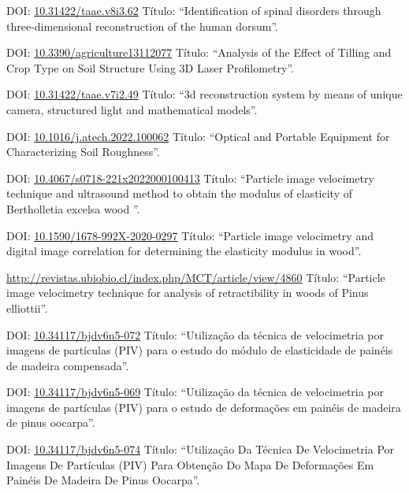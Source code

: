 \documentclass[11pt,a4paper,sans]{moderncv} %
\newcommand{\doiurl}[1]{\href{https://doi.org/#1}{#1}}
\begin{document}
	      {DOI: \doiurl{10.31422/taae.v8i3.62} }{}{}
	      {Título: ``Identification of spinal disorders through three-dimensional reconstruction of the human dorsum''.}
	      

	      {DOI: \doiurl{10.3390/agriculture13112077} }{}{}
	      {Título: ``Analysis of the Effect of Tilling and Crop Type on Soil Structure Using 3D Laser Profilometry''.}
	      
	      {DOI: \doiurl{10.31422/taae.v7i2.49} }{}{}
	      {Título: ``3d reconstruction system by means of unique camera, structured light and mathematical models''.}

	      {DOI: \doiurl{10.1016/j.atech.2022.100062} }{}{}
	      {Título: ``Optical and Portable Equipment for Characterizing Soil Roughness''.}
	      
	      {DOI: \doiurl{10.4067/s0718-221x2022000100413} }{}{}
	      {Título: ``Particle image velocimetry technique and ultrasound method to obtain the modulus of elasticity of Bertholletia excelsa wood ''.}
	      
	      {DOI: \doiurl{10.1590/1678-992X-2020-0297} }{}{}
	      {Título: ``Particle image velocimetry and digital image correlation for determining the elasticity modulus in wood''.}
	      
	      {\url{http://revistas.ubiobio.cl/index.php/MCT/article/view/4860}}{}{}
	      {Título: ``Particle image velocimetry technique for analysis of retractibility in woods of Pinus elliottii''.}
	      
	      {DOI: \doiurl{10.34117/bjdv6n5-072}}{}{}
	      {Título: ``Utilização da técnica de velocimetria por imagens de partículas (PIV) para o estudo do módulo de elasticidade de painéis de madeira compensada''.}

	      {DOI: \doiurl{10.34117/bjdv6n5-069}}{}{}
	      {Título: ``Utilização da técnica de velocimetria por imagens de partículas (PIV) para o estudo de deformações em painéis de madeira de pinus oocarpa''.}


	      {DOI: \doiurl{10.34117/bjdv6n5-074}}{}{}
	      {Título: ``Utilização Da Técnica De Velocimetria Por Imagens De Partículas (PIV) Para Obtenção Do Mapa De Deformações Em Painéis De Madeira De Pinus Oocarpa''.}
\end{document}
